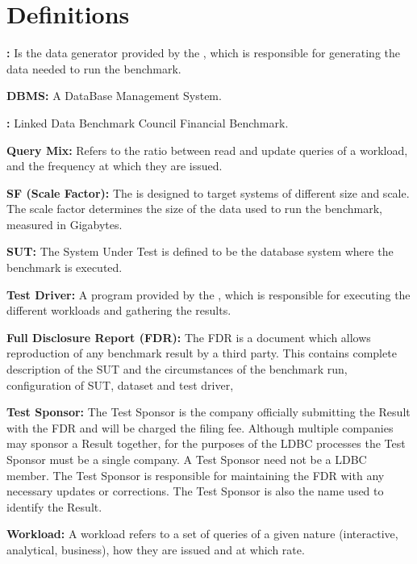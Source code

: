 \chapter*{Definitions}

{\flushleft \textbf{\datagen:}} Is the data generator provided by the \ldbcfinbench, which
is responsible for generating the data needed to run the benchmark.

{\flushleft \textbf{DBMS:}} A DataBase Management System. 

{\flushleft \textbf{\ldbcfinbench:}} Linked Data Benchmark Council Financial Benchmark. 

{\flushleft \textbf{Query Mix:}} Refers to the ratio between read and update queries
of a workload, and the frequency at which they are issued.

{\flushleft \textbf{SF (Scale Factor):}} The \ldbcfinbench is designed to target systems of
different size and scale. The scale factor determines the size of the data used
to run the benchmark, measured in Gigabytes.


{\flushleft \textbf{SUT:}} The System Under Test  is defined
to be the database system where the benchmark is executed.


{\flushleft \textbf{Test Driver:}}  A program provided by the \ldbcfinbench, which
is responsible for executing the different workloads and gathering the results.

{\flushleft \textbf{Full Disclosure Report (FDR):}} The FDR is a document which allows reproduction of any benchmark result by a third party. This contains complete description of the SUT and the circumstances of the benchmark run, \eg configuration of SUT, dataset and test driver, \etc

{\flushleft \textbf{Test Sponsor:}} The Test Sponsor is the company officially
submitting the Result with the FDR and will be charged the filing fee. Although
multiple companies may sponsor a Result together, for the purposes of the LDBC
processes the Test Sponsor must be a single company. A Test Sponsor need not be
a LDBC member. The Test Sponsor is responsible for maintaining the FDR with any
necessary updates or corrections. The Test Sponsor is also the name used to
identify the Result.

%



{\flushleft \textbf{Workload:}} A workload refers to a set of queries of a given nature
(\ie interactive, analytical, business), how they are issued and at which rate.
